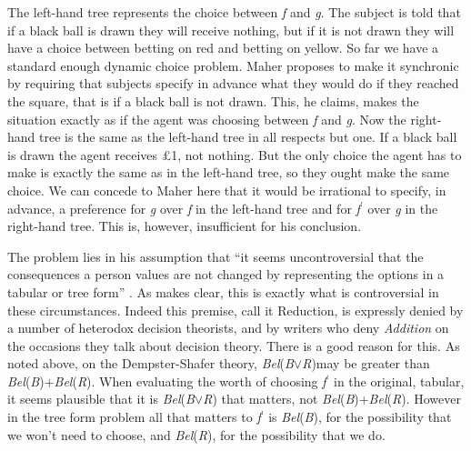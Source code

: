 The left-hand tree represents the choice between \textit{f} and \textit{g}. The subject is told that if a black ball is drawn they will receive nothing, but if it is not drawn they will have a choice between betting on red and betting on yellow. So far we have a standard enough dynamic choice problem. Maher proposes to make it synchronic by requiring that subjects specify in advance what they would do if they reached the square, that is if a black ball is not drawn. This, he claims, makes the situation exactly as if the agent was choosing between \textit{f} and \textit{g}. Now the right-hand tree is the same as the left-hand tree in all respects but one. If a black ball is drawn the agent receives \pounds 1, not nothing. But the only choice the agent has to make is exactly the same as in the left-hand tree, so they ought make the same choice. We can concede to Maher here that it would be irrational to specify, in advance, a preference for \textit{g} over \textit{f} in the left-hand tree and for \textit{f}\(^\prime\) over \textit{g} in the right-hand tree. This is, however, insufficient for his conclusion.


The problem lies in his assumption that ``it seems uncontroversial that the consequences a person values are not changed by representing the options in a tabular or tree form'' \citet[71]{Maher1993}. As \citet{Seidenfeld1994} makes clear, this is exactly what is controversial in these circumstances. Indeed this premise, call it Reduction, is expressly denied by a number of heterodox decision theorists, and by writers who deny \textit{Addition} on the occasions they talk about decision theory. There is a good reason for this. As noted above, on the Dempster-Shafer theory, \textit{Bel}(\textit{B}${\vee}$\textit{R})may be greater than \textit{Bel}(\textit{B})+\textit{Bel}(\textit{R}). When evaluating the worth of choosing \textit{f}\(^\prime\) in the original, tabular, it seems plausible that it is \textit{Bel}(\textit{B}${\vee}$\textit{R}) that matters, not \textit{Bel}(\textit{B})+\textit{Bel}(\textit{R}). However in the tree form problem all that matters to \textit{f}\(^\prime\) is \textit{Bel}(\textit{B}), for the possibility that we won't need to choose, and \textit{Bel}(\textit{R}), for the possibility that we do. 


